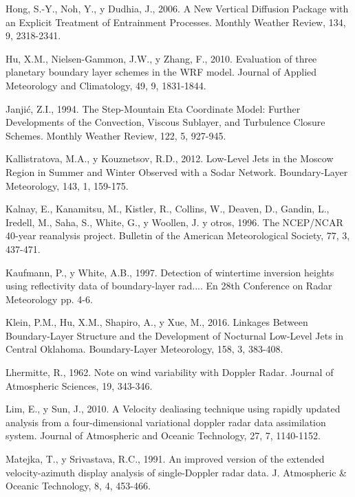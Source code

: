 \documentclass[12pt,spanish,oneside]{book}
\begin{document}
\hypertarget{ref-Hong2006}{}
Hong, S.-Y., Noh, Y., y Dudhia, J., 2006. A New Vertical Diffusion
Package with an Explicit Treatment of Entrainment Processes. Monthly
Weather Review, 134, 9, 2318-2341.

\hypertarget{ref-Hu2010}{}
Hu, X.M., Nielsen-Gammon, J.W., y Zhang, F., 2010. Evaluation of three
planetary boundary layer schemes in the WRF model. Journal of Applied
Meteorology and Climatology, 49, 9, 1831-1844.

\hypertarget{ref-Janjic1994}{}
Janjić, Z.I., 1994. The Step-Mountain Eta Coordinate Model: Further
Developments of the Convection, Viscous Sublayer, and Turbulence Closure
Schemes. Monthly Weather Review, 122, 5, 927-945.

\hypertarget{ref-Kallistratova2012}{}
Kallistratova, M.A., y Kouznetsov, R.D., 2012. Low-Level Jets in the
Moscow Region in Summer and Winter Observed with a Sodar Network.
Boundary-Layer Meteorology, 143, 1, 159-175.

\hypertarget{ref-Kalnay1996}{}
Kalnay, E., Kanamitsu, M., Kistler, R., Collins, W., Deaven, D., Gandin,
L., Iredell, M., Saha, S., White, G., y Woollen, J. y otros, 1996. The
NCEP/NCAR 40-year reanalysis project. Bulletin of the American
Meteorological Society, 77, 3, 437-471.

\hypertarget{ref-Kaufmann1997}{}
Kaufmann, P., y White, A.B., 1997. Detection of wintertime inversion
heights using reflectivity data of boundary-layer rad.... En 28th
Conference on Radar Meteorology pp. 4-6.

\hypertarget{ref-Klein2016}{}
Klein, P.M., Hu, X.M., Shapiro, A., y Xue, M., 2016. Linkages Between
Boundary-Layer Structure and the Development of Nocturnal Low-Level Jets
in Central Oklahoma. Boundary-Layer Meteorology, 158, 3, 383-408.

\hypertarget{ref-Lhermitte1962}{}
Lhermitte, R., 1962. Note on wind variability with Doppler Radar.
Journal of Atmospheric Sciences, 19, 343-346.

\hypertarget{ref-Lim2010}{}
Lim, E., y Sun, J., 2010. A Velocity dealiasing technique using rapidly
updated analysis from a four-dimensional variational doppler radar data
assimilation system. Journal of Atmospheric and Oceanic Technology, 27,
7, 1140-1152.

\hypertarget{ref-Matejka1991}{}
Matejka, T., y Srivastava, R.C., 1991. An improved version of the
extended velocity-azimuth display analysis of single-Doppler radar data.
J. Atmospheric \& Oceanic Technology, 8, 4, 453-466.
\end{document}
